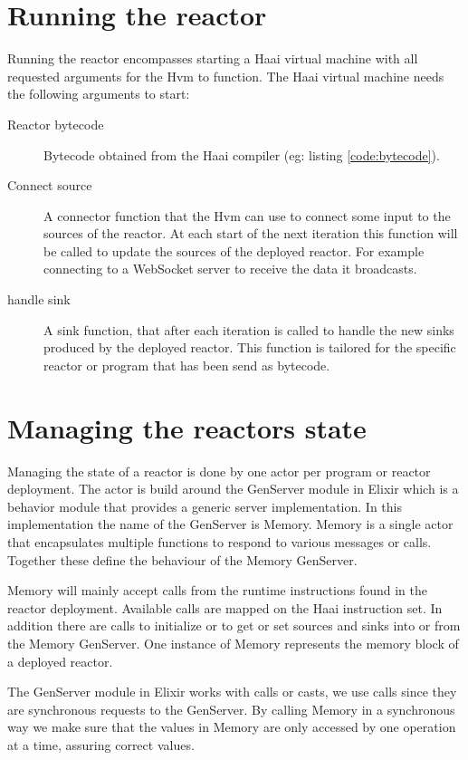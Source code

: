 \documentclass[a4paper]{book}
\begin{document}
\section{Running the reactor}
Running the reactor encompasses starting a Haai virtual machine with all requested arguments for the Hvm to function. The Haai virtual machine needs the following arguments to start: 
\begin{description}
	\item[Reactor bytecode] Bytecode obtained from the Haai compiler (eg: listing \ref{code:bytecode}).
	\item[Connect source] A connector function that the Hvm can use to connect some input to the sources of the reactor. At each start of the next iteration this function will be called to update the sources of the deployed reactor. For example connecting to a WebSocket server to receive the data it broadcasts.
	\item[handle sink] A sink function, that after each iteration is called to handle the new sinks produced by the deployed reactor. This function is tailored for the specific reactor or program that has been send as bytecode.
\end{description}

\section{Managing the reactors state}
Managing the state of a reactor is done by one actor per program or reactor deployment. The actor is build around the GenServer module in Elixir which is a behavior module that provides a generic server implementation. In this implementation the name of the GenServer is Memory. Memory is a single actor that encapsulates multiple functions to respond to various messages or calls. Together these define the behaviour of the Memory GenServer.

Memory will mainly accept calls from the runtime instructions found in the reactor deployment. Available calls are mapped on the Haai instruction set. In addition there are calls to initialize or to get or set sources and sinks into or from the Memory GenServer. One instance of Memory represents the memory block of a deployed reactor.

The GenServer module in Elixir works with calls or casts, we use calls since they are synchronous requests to the GenServer. By calling Memory in a synchronous way we make sure that the values in Memory are only accessed by one operation at a time, assuring correct values. 
\end{document}
